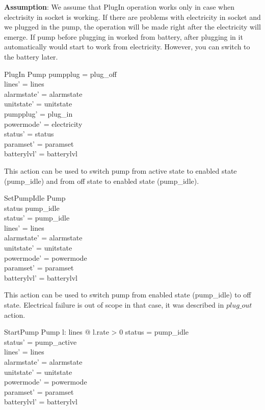 \documentclass{article}
\begin{document}
	 \textbf{Assumption}: We assume that PlugIn operation works only in case when electrisity in socket is working. If there are problems with electricity in socket and we plugged in the pump, the operation will be made right after the electricity will emerge. If pump before plugging in worked from battery, after plugging in it automatically would start to work from electricity. However, you can switch to the battery later. 
	
	\begin{schema}{PlugIn}
		\Delta Pump 
	\where
		pumpplug = plug\_off \\
		lines' = lines  \\
    	alarmstate' = alarmstate \\
    	unitstate' = unitstate \\
    	pumpplug' = plug\_in \\
    	powermode' = electricity \\
		status' = status \\
		paramset' = paramset\\
		batterylvl' = batterylvl	
	\end{schema}
   


	This action can be used to switch pump from active state to enabled state (pump\_idle) and from off state to enabled state (pump\_idle).
	\begin{schema}{SetPumpIdle}
		\Delta Pump \\
	\where 
		status \neq pump\_idle \\
		status' = pump\_idle \\
		lines' = lines \\
    	alarmstate' = alarmstate \\
    	unitstate' = unitstate \\
    	powermode' = powermode \\
		paramset' = paramset\\
		batterylvl' = batterylvl
	\end{schema}
	

	
	
			This action can be used to switch pump from enabled state (pump\_idle) to off state. Electrical failure is out of scope in that case, it was described in $plug\_out$ action. 	
			
	\begin{schema}{StartPump}
		\Delta Pump
	\where
		\exists l: \ran lines @ l.rate > 0
		status = pump\_idle \\ 
		status' = pump\_active \\
		lines' = lines  \\
    	alarmstate' = alarmstate \\
    	unitstate' = unitstate \\
    	powermode' = powermode \\
		paramset' = paramset\\
		batterylvl' = batterylvl
	\end{schema}
	
\end{document}

